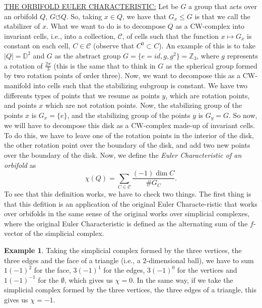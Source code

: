 \documentclass[12pt,a4paper,oneside]{article}
\numberwithin{equation}{section}
\theoremstyle{definition}
\newtheorem{example}{Example}
\begin{document}
\underline{THE ORBIFOLD EULER CHARACTERISTIC:} \newline \newline
Let be $G$ a group that acts over an orbifold $Q$, $G \circlearrowleft Q$. \newline
So, taking $x \in Q$, we have that $G_{x} \leq G$ is that we call the stabilizer of $x$. \newline
What we want to do is to decompose $Q$ as a CW-complex into invariant cells, i.e., into a collection, $\mathcal{C}$, of cells such that the function $x \mapsto G_{x}$ is constant on each cell, $C \in \mathcal{C}$ (observe that $C^{0} \subset C$). \newline
An example of this is to take $\vert Q \vert = \mathbb{D}^{2}$ and $G$ as the abstract group $G = \lbrace e = id, g, g^{2} \rbrace = \mathbb{Z}_{3}$, where $g$ represents a rotation of $\frac{2 \pi}{3}$ (this is the same that to think in $G$ as the spherical group formed by two rotation points of order three). Now, we want to decompose this as a CW-manifold into cells such that the stabilizing subgroup is constant. We have two differents types of points that we resume as points $y$, which are rotation points, and points $x$ which are not rotation points. Now, the stabilizing group of the points $x$ is $G_{x} = \lbrace e \rbrace$, and the stabilizing group of the points $y$ is $G_{y} = G$. So now, we will have to decompose this disk as a CW-complex made-up of invariant cells. To do this, we have to leave one of the rotation points in the interior of the disk, the other rotation point over the boundary of the disk, and add two new points over the boundary of the disk. \newline
Now, we define the \textsl{Euler Characteristic of an orbifold} as $$\chi (Q) = \sum_{C \in \mathcal{C}} \frac{(-1) \dim C}{\# G_{C}}.$$
To see that this definition works, we have to check two things. \newline
The first thing is that this defition is an application of the original Euler Characte-ristic that works over orbifolds in the same sense of the original works over simplicial complexes, where the original Euler Characteristic is defined as the alternating sum of the $f$-vector of the simplicial complex.
\begin{example} Taking the simplicial complex formed by the three vertices, the three edges and the face of a triangle (i.e., a $2$-dimensional ball), we have to sum $1(-1)^{2}$ for the face, $3(-1)^{1}$ for the edges, $3(-1)^{0}$ for the vertices and $1(-1)^{-1}$ for the $\emptyset$, which gives us $\chi = 0$. \newline
In the same way, if we take the simplicial complex formed by the three vertices, the three edges of a triangle, this gives us $\chi = -1$. \newline
\end{example}
\end{document}

